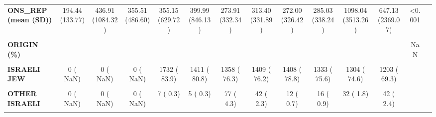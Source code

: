 \documentclass[
]{article}
\begin{document}
\begin{table}[H]
\begin{tabular}[t]{>{\raggedright\arraybackslash}p{5em}ccccccccccccc}
\textbf{ONS\_REP (mean (SD))} & 194.44 (133.77) & 436.91 (1084.32) & 355.51 (486.60) & 355.15 (629.72) & 399.99 (846.13) & 273.91 (332.34) & 313.40 (331.89) & 272.00 (326.42) & 285.03 (338.24) & 1098.04 (3513.26) & 647.13 (2369.07) & <0.001 & \\
\textbf{\cellcolor{gray!10}{ONS\_TLX (mean (SD))}} & \cellcolor{gray!10}{190.55 (101.87)} & \cellcolor{gray!10}{364.37 (833.72)} & \cellcolor{gray!10}{219.94 (267.51)} & \cellcolor{gray!10}{267.04 (307.66)} & \cellcolor{gray!10}{359.71 (895.51)} & \cellcolor{gray!10}{178.33 (165.52)} & \cellcolor{gray!10}{128.33 (76.24)} & \cellcolor{gray!10}{143.38 (49.50)} & \cellcolor{gray!10}{NaN (NA)} & \cellcolor{gray!10}{NaN (NA)} & \cellcolor{gray!10}{NaN (NA)} & \cellcolor{gray!10}{0.002} & \cellcolor{gray!10}{}\\
\textbf{ORIGIN (\%)} &  &  &  &  &  &  &  &  &  &  &  & NaN & \\
\textbf{\cellcolor{gray!10}{ISRAELI ARAB}} & \cellcolor{gray!10}{0 (  NaN)} & \cellcolor{gray!10}{0 (  NaN)} & \cellcolor{gray!10}{0 (  NaN)} & \cellcolor{gray!10}{313 ( 15.2)} & \cellcolor{gray!10}{309 ( 17.7)} & \cellcolor{gray!10}{322 ( 18.1)} & \cellcolor{gray!10}{375 ( 20.3)} & \cellcolor{gray!10}{348 ( 19.5)} & \cellcolor{gray!10}{391 ( 22.2)} & \cellcolor{gray!10}{400 ( 22.9)} & \cellcolor{gray!10}{474 ( 27.3)} & \cellcolor{gray!10}{} & \cellcolor{gray!10}{}\\
\textbf{ISRAELI JEW} & 0 (  NaN) & 0 (  NaN) & 0 (  NaN) & 1732 ( 83.9) & 1411 ( 80.8) & 1358 ( 76.3) & 1409 ( 76.2) & 1408 ( 78.8) & 1333 ( 75.6) & 1304 ( 74.6) & 1203 ( 69.3) &  & \\
\textbf{\cellcolor{gray!10}{OTHER}} & \cellcolor{gray!10}{0 (  NaN)} & \cellcolor{gray!10}{0 (  NaN)} & \cellcolor{gray!10}{0 (  NaN)} & \cellcolor{gray!10}{1 (  0.0)} & \cellcolor{gray!10}{2 (  0.1)} & \cellcolor{gray!10}{10 (  0.6)} & \cellcolor{gray!10}{12 (  0.6)} & \cellcolor{gray!10}{11 (  0.6)} & \cellcolor{gray!10}{17 (  1.0)} & \cellcolor{gray!10}{8 (  0.5)} & \cellcolor{gray!10}{10 (  0.6)} & \cellcolor{gray!10}{} & \cellcolor{gray!10}{}\\
\textbf{OTHER ISRAELI} & 0 (  NaN) & 0 (  NaN) & 0 (  NaN) & 7 (  0.3) & 5 (  0.3) & 77 (  4.3) & 42 (  2.3) & 12 (  0.7) & 16 (  0.9) & 32 (  1.8) & 42 (  2.4) &  & \\
\textbf{\cellcolor{gray!10}{TOURIST}} & \cellcolor{gray!10}{0 (  NaN)} & \cellcolor{gray!10}{0 (  NaN)} & \cellcolor{gray!10}{0 (  NaN)} & \cellcolor{gray!10}{11 (  0.5)} & \cellcolor{gray!10}{19 (  1.1)} & \cellcolor{gray!10}{12 (  0.7)} & \cellcolor{gray!10}{12 (  0.6)} & \cellcolor{gray!10}{7 (  0.4)} & \cellcolor{gray!10}{6 (  0.3)} & \cellcolor{gray!10}{4 (  0.2)} & \cellcolor{gray!10}{7 (  0.4)} & \cellcolor{gray!10}{} & \cellcolor{gray!10}{}\\

\end{tabular}
\end{table}
\end{document}
